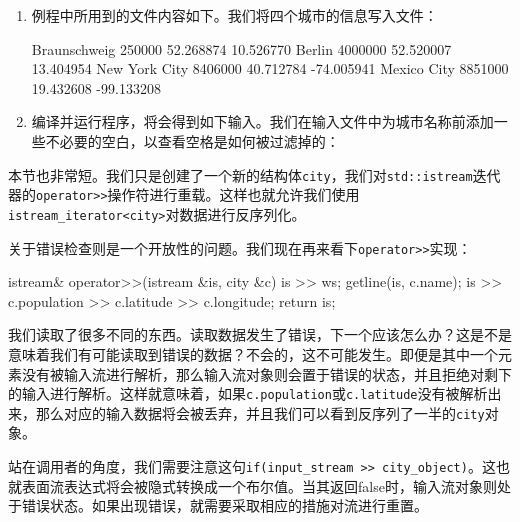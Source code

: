 \begin{enumerate}
\item 例程中所用到的文件内容如下。我们将四个城市的信息写入文件：

\begin{codebox}[cpp]
Braunschweig
250000 52.268874 10.526770
Berlin
4000000 52.520007 13.404954
New York City
8406000 40.712784 -74.005941
Mexico City
8851000 19.432608 -99.133208
\end{codebox}

\item 编译并运行程序，将会得到如下输入。我们在输入文件中为城市名称前添加一些不必要的空白，以查看空格是如何被过滤掉的：


\end{enumerate}


本节也非常短。我们只是创建了一个新的结构体\texttt{city}，我们对\texttt{std::istream}迭代器的\texttt{operator>>}操作符进行重载。这样也就允许我们使用\texttt{istream\_iterator<city>}对数据进行反序列化。

关于错误检查则是一个开放性的问题。我们现在再来看下\texttt{operator>>}实现：

\begin{codebox}[cpp]
istream& operator>>(istream &is, city &c)
{
    is >> ws;
    getline(is, c.name);
    is >> c.population >> c.latitude >> c.longitude;
    return is;
}
\end{codebox}

我们读取了很多不同的东西。读取数据发生了错误，下一个应该怎么办？这是不是意味着我们有可能读取到错误的数据？不会的，这不可能发生。即便是其中一个元素没有被输入流进行解析，那么输入流对象则会置于错误的状态，并且拒绝对剩下的输入进行解析。这样就意味着，如果\texttt{c.population}或\texttt{c.latitude}没有被解析出来，那么对应的输入数据将会被丢弃，并且我们可以看到反序列了一半的\texttt{city}对象。

站在调用者的角度，我们需要注意这句\texttt{if(input\_stream >> city\_object)}。这也就表面流表达式将会被隐式转换成一个布尔值。当其返回false时，输入流对象则处于错误状态。如果出现错误，就需要采取相应的措施对流进行重置。


